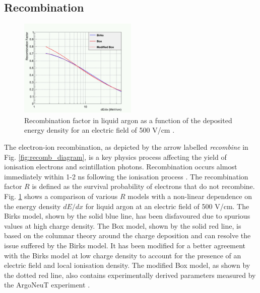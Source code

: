 \subsection{Recombination}
\label{sec:recomb}

\begin{figure}[b!] 
\centering    
\includegraphics[width=0.5\textwidth]{recomb_graph}
\caption[Reombination Factor in Liquid Argon]{
Recombination factor in liquid argon as a function of the deposited energy density for an electric field of 500 V/cm \cite{argoneut_recomb}.
}
\label{fig:recomb_graph}
\end{figure}

The electron-ion recombination, as depicted by the arrow labelled \textit{recombine} in Fig. \ref{fig:recomb_diagram}, is a key physics process affecting the yield of ionisation electrons and scintillation photons.
Recombination occurs almost immediately within 1-2 ns following the ionisation process \cite{argoneut_recomb}.             
The recombination factor $R$ is defined as the survival probability of electrons that do not recombine.
Fig. \ref{fig:recomb_graph} shows a comparison of various $R$ models with a non-linear dependence on the energy density $dE/dx$ for liquid argon at an electric field of 500 V/cm.
The Birks model, shown by the solid blue line, has been disfavoured due to spurious values at high charge density.
The Box model, shown by the solid red line, is based on the columnar theory around the charge deposition and can resolve the issue suffered by the Birks model.
It has been modified for a better agreement with the Birks model at low charge density to account for the presence of an electric field and local ionisation density.
The modified Box model, as shown by the dotted red line, also contains experimentally derived parameters measured by the ArgoNeuT experiment \cite{argoneut_recomb}.


